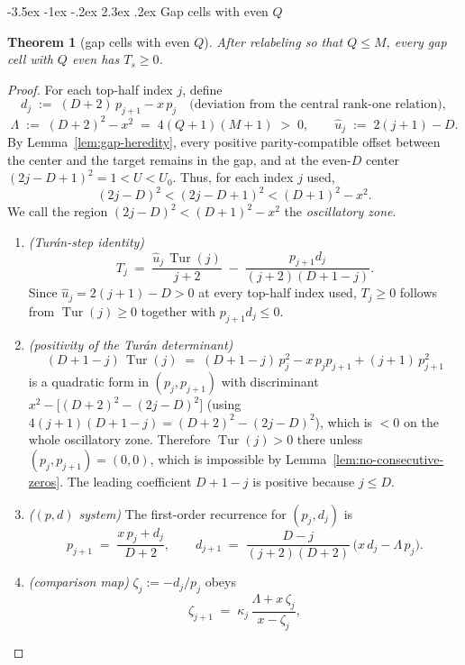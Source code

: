 \documentclass[twoside,10pt]{article}
\makeatletter
\numberwithin{equation}{section}
\theoremstyle{slbody}
\newtheorem{theorem}{Theorem}
\theoremstyle{definition}
\theoremstyle{remark}
\numberwithin{theorem}{section}
\DeclareMathOperator{\Tur}{Tur}
\renewcommand{\section}{%
  \@startsection{section}{1}{\z@}%
    {-3.5ex \@plus -1ex \@minus -.2ex}%
    {2.3ex \@plus .2ex}%
    {\normalfont\large\bfseries}}
\makeatother
\begin{document}
\section{Gap cells with even \texorpdfstring{$Q$}{Q}}\label{sec:evenflow}

\begin{theorem}[gap cells with even $Q$]\label{thm:evenflow}
After relabeling so that $Q\le M$, every gap cell with $Q$ even has
$T_s\ge 0$.
\end{theorem}

\begin{proof}
For each top-half index $j$, define
\[
  d_j \;:=\; (D+2)\,p_{j+1}-x\,p_j
  \quad\text{(deviation from the central rank-one relation)},
\]
\[
  \Lambda \;:=\; (D+2)^2-x^2 \;=\; 4(Q+1)(M+1) \;>\; 0, \qquad
  \widehat u_j \;:=\; 2(j+1)-D .
\]
By Lemma~\ref{lem:gap-heredity}, every positive parity-compatible offset
between the center and the target remains in the gap, and at the even-$D$
center $(2j-D+1)^2=1<U<U_0$.  Thus, for each index $j$ used,
\[
 (2j-D)^2<(2j-D+1)^2<(D+1)^2-x^2.
\]
We call the region $(2j-D)^2<(D+1)^2-x^2$ the \emph{oscillatory zone}.
\begin{enumerate}
\item \emph{(Tur\'an-step identity)}
  \begin{equation}\label{eq:steppair}
    T_j \;=\; \frac{\widehat u_j\,\Tur(j)}{j+2}
    \;-\; \frac{p_{j+1}d_j}{(j+2)(D+1-j)} .
  \end{equation}
  Since $\widehat u_j=2(j+1)-D>0$ at every top-half index used,
  $T_j\ge 0$ follows
  from $\Tur(j)\ge 0$ together with $p_{j+1}d_j\le 0$.
\item \emph{(positivity of the Tur\'an determinant)}
  \[
    (D+1-j)\,\Tur(j) \;=\; (D+1-j)\,p_j^2-x\,p_jp_{j+1}+(j+1)\,p_{j+1}^2
  \]
  is a quadratic form in $(p_j,p_{j+1})$ with discriminant
  $x^2-\bigl[(D+2)^2-(2j-D)^2\bigr]$ (using
  $4(j+1)(D+1-j)=(D+2)^2-(2j-D)^2$), which is $<0$ on the whole oscillatory
  zone.  Therefore
  $\Tur(j)>0$ there unless $(p_j,p_{j+1})=(0,0)$, which is impossible by
  Lemma~\ref{lem:no-consecutive-zeros}.  The leading coefficient
  $D+1-j$ is positive because $j\le D$.
\item \emph{($(p,d)$ system)}  The first-order recurrence for $(p_j,d_j)$ is
  \[
    p_{j+1} \;=\; \frac{x\,p_j+d_j}{D+2}, \qquad
    d_{j+1} \;=\; \frac{D-j}{(j+2)(D+2)}\,\bigl(x\,d_j-\Lambda\,p_j\bigr).
  \]
\item \emph{(comparison map)}  $\zeta_j:=-d_j/p_j$ obeys
  \[
    \zeta_{j+1} \;=\; \kappa_j\,\frac{\Lambda+x\,\zeta_j}{x-\zeta_j},
\]
\end{enumerate}
\end{proof}
\end{document}
